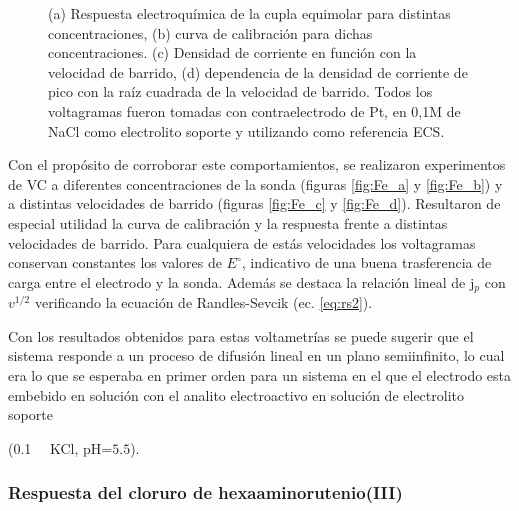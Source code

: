 {\begin{figure}[ht]
     		 \caption[Respuesta electroquímica para \fe]{(a) Respuesta electroquímica de la cupla equimolar \fe\space para distintas concentraciones, (b) curva de calibración para dichas concentraciones. (c) Densidad de corriente en función con la velocidad de barrido, (d) dependencia de la densidad de corriente de pico con la raíz cuadrada de la velocidad de barrido. Todos los voltagramas fueron tomadas con contraelectrodo de Pt, en 0,1M de NaCl como electrolito soporte y utilizando como referencia ECS.}
     		 \label{fig:ferro-ferri-CV}
     		 \end{figure}

     		 Con el propósito de corroborar este comportamientos, se realizaron experimentos de VC a diferentes concentraciones de la sonda (figuras \ref{fig:Fe_a} y  \ref{fig:Fe_b}) y a distintas velocidades de barrido (figuras \ref{fig:Fe_c} y  \ref{fig:Fe_d}). Resultaron de especial utilidad la curva de calibración y la respuesta frente a distintas velocidades de barrido. Para cualquiera de estás velocidades los voltagramas conservan constantes los valores de $E^\circ$, indicativo de una buena trasferencia de carga entre el electrodo y la sonda. Además se destaca la relación lineal de j$_p$ con $v^{1/2}$ verificando la ecuación de Randles-Sevcik (ec. \ref{eq:rs2}).		  	  
  					
		  	 Con los resultados obtenidos para estas voltametrías se puede sugerir que el sistema responde a un proceso de difusión lineal en un plano semiinfinito, lo cual era lo que se esperaba en primer orden para un sistema en el que el electrodo esta embebido en solución con el analito electroactivo en solución de electrolito soporte {(\SI{0,1}{\milli\Molar} KCl, pH=$5.5$)\cite{Wi2000,Pumera2007,Gewirth2004,Villullas2000}.

	 	\subsubsection*{Respuesta del cloruro de hexaaminorutenio(III)}
	
}}
